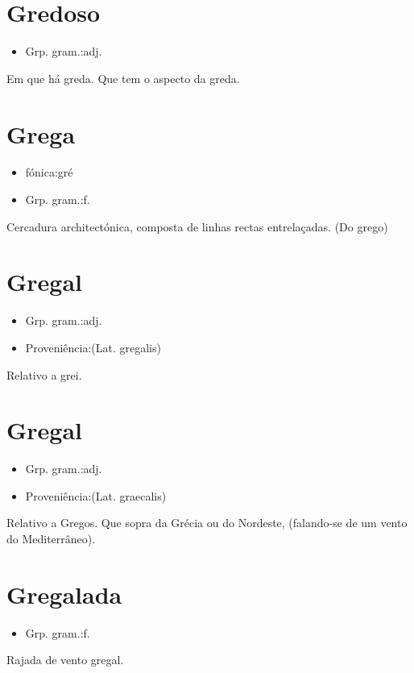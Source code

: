 \section{Gredoso}
\begin{itemize}
\item {Grp. gram.:adj.}
\end{itemize}
Em que há greda.
Que tem o aspecto da greda.
\section{Grega}
\begin{itemize}
\item {fónica:gré}
\end{itemize}
\begin{itemize}
\item {Grp. gram.:f.}
\end{itemize}
Cercadura architectónica, composta de linhas rectas entrelaçadas.
(Do \textunderscore grego\textunderscore )
\section{Gregal}
\begin{itemize}
\item {Grp. gram.:adj.}
\end{itemize}
\begin{itemize}
\item {Proveniência:(Lat. \textunderscore gregalis\textunderscore )}
\end{itemize}
Relativo a grei.
\section{Gregal}
\begin{itemize}
\item {Grp. gram.:adj.}
\end{itemize}
\begin{itemize}
\item {Proveniência:(Lat. \textunderscore graecalis\textunderscore )}
\end{itemize}
Relativo a Gregos.
Que sopra da Grécia ou do Nordeste, (falando-se de um vento do Mediterrâneo).
\section{Gregalada}
\begin{itemize}
\item {Grp. gram.:f.}
\end{itemize}
Rajada de vento gregal.
